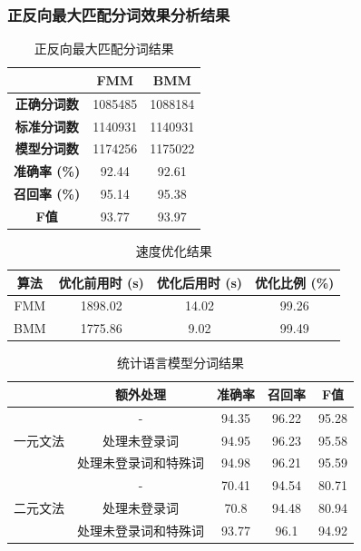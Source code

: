 \documentclass[11pt,a4paper]{article}
\begin{document}
	\subsubsection{正反向最大匹配分词效果分析结果}
	\begin{table}[htb]
		\centering
		\begin{tabular}{ccc}
			\hline
			& \textbf{FMM} & \textbf{BMM} \\ \hline
			\textbf{正确分词数}    & 1085485      & 1088184      \\
			\textbf{标准分词数}    & 1140931      & 1140931      \\
			\textbf{模型分词数}    & 1174256      & 1175022      \\
			\textbf{准确率 (\%)} & 92.44        & 92.61        \\
			\textbf{召回率 (\%)} & 95.14        & 95.38        \\
			\textbf{F值}       & 93.77        & 93.97        \\ \hline
		\end{tabular}
		\caption{正反向最大匹配分词结果}
		\label{lyy:t1}
	\end{table}
	\begin{table}[htb]
		\centering
		\begin{tabular}{cccc}
			\hline
			算法  & 优化前用时 (s) & 优化后用时 (s) & 优化比例 (\%) \\ \hline
			FMM & 1898.02   & 14.02     & 99.26     \\
			BMM & 1775.86   & 9.02      & 99.49     \\ \hline
		\end{tabular}
		\caption{速度优化结果}
		\label{lyy:t2}
	\end{table}
	\begin{table}[!htb]
		\centering
		\begin{tabular}{ccccc}
			\hline
			& \textbf{额外处理} & \textbf{准确率} & \textbf{召回率} & \textbf{F值} \\ \hline
			\multirow{3}{*}{一元文法} & -             & 94.35        & 96.22        & 95.28       \\
			& 处理未登录词        & 94.95        & 96.23        & 95.58       \\
			& 处理未登录词和特殊词    & 94.98        & 96.21        & 95.59       \\ \hline
			\multirow{3}{*}{二元文法} & -             & 70.41        & 94.54        & 80.71       \\
			& 处理未登录词        & 70.8         & 94.48        & 80.94       \\
			& 处理未登录词和特殊词    & 93.77        & 96.1         & 94.92       \\ \hline
		\end{tabular}
		\caption{统计语言模型分词结果}
		\label{t}
	\end{table}
	
\end{document}
